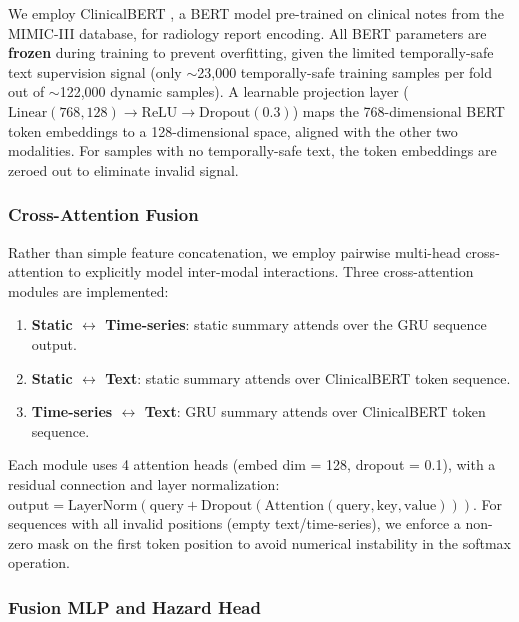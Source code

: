 \documentclass[10pt, a4paper]{article}
\begin{document}
We employ ClinicalBERT \citep{alsentzer2019clinicalbert}, a BERT model pre-trained on clinical notes from the MIMIC-III database, for radiology report encoding. All BERT parameters are \textbf{frozen} during training to prevent overfitting, given the limited temporally-safe text supervision signal (only $\sim$23{,}000 temporally-safe training samples per fold out of $\sim$122{,}000 dynamic samples). A learnable projection layer ($\text{Linear}(768, 128) \to \text{ReLU} \to \text{Dropout}(0.3)$) maps the 768-dimensional BERT token embeddings to a 128-dimensional space, aligned with the other two modalities. For samples with no temporally-safe text, the token embeddings are zeroed out to eliminate invalid signal.

\subsubsection{Cross-Attention Fusion}

Rather than simple feature concatenation, we employ pairwise multi-head cross-attention to explicitly model inter-modal interactions. Three cross-attention modules are implemented:
\begin{enumerate}[nosep]
    \item \textbf{Static $\leftrightarrow$ Time-series}: static summary attends over the GRU sequence output.
    \item \textbf{Static $\leftrightarrow$ Text}: static summary attends over ClinicalBERT token sequence.
    \item \textbf{Time-series $\leftrightarrow$ Text}: GRU summary attends over ClinicalBERT token sequence.
\end{enumerate}
Each module uses 4 attention heads (embed dim = 128, dropout = 0.1), with a residual connection and layer normalization: $\text{output} = \text{LayerNorm}(\text{query} + \text{Dropout}(\text{Attention}(\text{query}, \text{key}, \text{value})))$. For sequences with all invalid positions (empty text/time-series), we enforce a non-zero mask on the first token position to avoid numerical instability in the softmax operation.
\subsubsection{Fusion MLP and Hazard Head}
\end{document}
